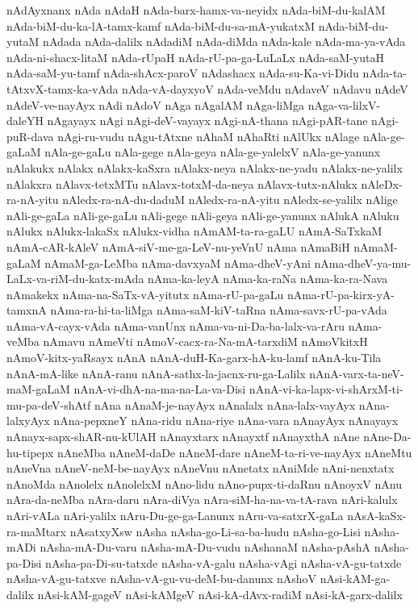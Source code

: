 {nAdAyxnanx
nAda
nAdaH
nAda-barx-hamx-va-neyidx
nAda-biM-du-kalAM
nAda-biM-du-ka-lA-tamx-kamf
nAda-biM-du-sa-mA-yukatxM
nAda-biM-du-yutaM
nAdada
nAda-dalilx
nAdadiM
nAda-diMda
nAda-kale
nAda-ma-ya-vAda
nAda-ni-shacx-litaM
nAda-rUpaH
nAda-rU-pa-ga-LuLaLx
nAda-saM-yutaH
nAda-saM-yu-tamf
nAda-shAcx-paroV
nAdashacx
nAda-su-Ka-vi-Didu
nAda-ta-tAtxvX-tamx-ka-vAda
nAda-vA-dayxyoV
nAda-veMdu
nAdaveV
nAdavu
nAdeV
nAdeV-ve-nayAyx
nAdi
nAdoV
nAga
nAgalAM
nAga-liMga
nAga-va-lilxV-daleYH
nAgayayx
nAgi
nAgi-deV-vayayx
nAgi-nA-thana
nAgi-pAR-tane
nAgi-puR-dava
nAgi-ru-vudu
nAgu-tAtxne
nAhaM
nAhaRti
nAlUkx
nAlage
nAla-ge-gaLaM
nAla-ge-gaLu
nAla-gege
nAla-geya
nAla-ge-yalelxV
nAla-ge-yanunx
nAlakukx
nAlakx
nAlakx-kaSxra
nAlakx-neya
nAlakx-ne-yadu
nAlakx-ne-yalilx
nAlakxra
nAlavx-tetxMTu
nAlavx-totxM-da-neya
nAlavx-tutx-nAlukx
nAleDx-ra-nA-yitu
nAledx-ra-nA-du-daduM
nAledx-ra-nA-yitu
nAledx-se-yalilx
nAlige
nAli-ge-gaLa
nAli-ge-gaLu
nAli-gege
nAli-geya
nAli-ge-yanunx
nAlukA
nAluku
nAlukx
nAlukx-lakaSx
nAlukx-vidha
nAmAM-ta-ra-gaLU
nAmA-SaTxkaM
nAmA-cAR-kAleV
nAmA-siV-me-ga-LeV-nu-yeVnU
nAma
nAmaBiH
nAmaM-gaLaM
nAmaM-ga-LeMba
nAma-davxyaM
nAma-dheV-yAni
nAma-dheV-ya-mu-LaLx-va-riM-du-katx-mAda
nAma-ka-leyA
nAma-ka-raNa
nAma-ka-ra-Nava
nAmakekx
nAma-na-SaTx-vA-yitutx
nAma-rU-pa-gaLu
nAma-rU-pa-kirx-yA-tamxnA
nAma-ra-hi-ta-liMga
nAma-saM-kiV-taRna
nAma-savx-rU-pa-vAda
nAma-vA-cayx-vAda
nAma-vanUnx
nAma-va-ni-Da-ba-lalx-va-rAru
nAma-veMba
nAmavu
nAmeVti
nAmoV-cacx-ra-Na-mA-tarxdiM
nAmoVkitxH
nAmoV-kitx-yaRsayx
nAnA
nAnA-duH-Ka-garx-hA-ku-lamf
nAnA-ku-Tila
nAnA-mA-like
nAnA-ranu
nAnA-sathx-la-jacnx-ru-ga-Lalilx
nAnA-varx-ta-neV-maM-gaLaM
nAnA-vi-dhA-na-ma-na-La-va-Disi
nAnA-vi-ka-lapx-vi-shArxM-ti-mu-pa-deV-shAtf
nAna
nAnaM-je-nayAyx
nAnalalx
nAna-lalx-vayAyx
nAna-lalxyAyx
nAna-pepxneY
nAna-ridu
nAna-riye
nAna-vara
nAnayAyx
nAnayayx
nAnayx-sapx-shAR-nu-kUlAH
nAnayxtarx
nAnayxtf
nAnayxthA
nAne
nAne-Da-hu-tipepx
nAneMba
nAneM-daDe
nAneM-dare
nAneM-ta-ri-ve-nayAyx
nAneMtu
nAneVna
nAneV-neM-be-nayAyx
nAneVnu
nAnetatx
nAniMde
nAni-nenxtatx
nAnoMda
nAnolelx
nAnolelxM
nAno-lidu
nAno-pupx-ti-daRnu
nAnoyxV
nAnu
nAra-da-neMba
nAra-daru
nAra-diVya
nAra-siM-ha-na-va-tA-rava
nAri-kalulx
nAri-vALa
nAri-yalilx
nAru-Du-ge-ga-Lanunx
nAru-va-satxrX-gaLa
nAsA-kaSx-ra-maMtarx
nAsatxyXsw
nAsha
nAsha-go-Li-sa-ba-hudu
nAsha-go-Lisi
nAsha-mADi
nAsha-mA-Du-varu
nAsha-mA-Du-vudu
nAshanaM
nAsha-pAshA
nAsha-pa-Disi
nAsha-pa-Di-su-tatxde
nAsha-vA-galu
nAsha-vAgi
nAsha-vA-gu-tatxde
nAsha-vA-gu-tatxve
nAsha-vA-gu-vu-deM-bu-danunx
nAshoV
nAsi-kAM-ga-dalilx
nAsi-kAM-gageV
nAsi-kAMgeV
nAsi-kA-dAvx-radiM
nAsi-kA-garx-dalilx
}
